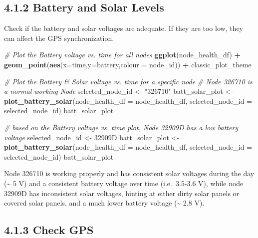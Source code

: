 \documentclass[
]{book}
\newenvironment{Shaded}{\begin{snugshade}}{\end{snugshade}}
\newcommand{\AttributeTok}[1]{\textcolor[rgb]{0.13,0.29,0.53}{#1}}
\newcommand{\CommentTok}[1]{\textcolor[rgb]{0.56,0.35,0.01}{\textit{#1}}}
\newcommand{\FunctionTok}[1]{\textcolor[rgb]{0.13,0.29,0.53}{\textbf{#1}}}
\newcommand{\NormalTok}[1]{#1}
\newcommand{\OtherTok}[1]{\textcolor[rgb]{0.56,0.35,0.01}{#1}}
\newcommand{\SpecialCharTok}[1]{\textcolor[rgb]{0.81,0.36,0.00}{\textbf{#1}}}
\newcommand{\StringTok}[1]{\textcolor[rgb]{0.31,0.60,0.02}{#1}}
\begin{document}
\subsection{4.1.2 Battery and Solar Levels}\label{battery-and-solar-levels}

Check if the battery and solar voltages are adequate. If they are too low, they can affect the GPS synchronization.

\begin{Shaded}
\begin{Highlighting}[]
\CommentTok{\# Plot the Battery voltage vs. time for all nodes}
\FunctionTok{ggplot}\NormalTok{(node\_health\_df) }\SpecialCharTok{+}
  \FunctionTok{geom\_point}\NormalTok{(}\FunctionTok{aes}\NormalTok{(}\AttributeTok{x=}\NormalTok{time,}\AttributeTok{y=}\NormalTok{battery,}\AttributeTok{colour =}\NormalTok{ node\_id)) }\SpecialCharTok{+}
\NormalTok{  classic\_plot\_theme}

\CommentTok{\# Plot the Battery \& Solar voltage vs. time for a specific node}
\CommentTok{\# Node 326710 is a normal working Node}
\NormalTok{selected\_node\_id }\OtherTok{\textless{}{-}} \StringTok{"326710"}
\NormalTok{batt\_solar\_plot }\OtherTok{\textless{}{-}} \FunctionTok{plot\_battery\_solar}\NormalTok{(}\AttributeTok{node\_health\_df =}\NormalTok{ node\_health\_df, }\AttributeTok{selected\_node\_id =}\NormalTok{ selected\_node\_id)}
\NormalTok{batt\_solar\_plot }

\CommentTok{\# based on the Battery voltage vs. time plot, Node 32909D has a low battery voltage}
\NormalTok{selected\_node\_id }\OtherTok{\textless{}{-}} \StringTok{\textquotesingle{}32909D\textquotesingle{}}
\NormalTok{batt\_solar\_plot }\OtherTok{\textless{}{-}} \FunctionTok{plot\_battery\_solar}\NormalTok{(}\AttributeTok{node\_health\_df =}\NormalTok{ node\_health\_df, }\AttributeTok{selected\_node\_id =}\NormalTok{ selected\_node\_id)}
\NormalTok{batt\_solar\_plot }
\end{Highlighting}
\end{Shaded}

Node 326710 is working properly and has consistent solar voltages during the day (\textasciitilde{} 5 V) and a consistent battery voltage over time (i.e.~3.5-3.6 V), while node 32909D has inconsistent solar voltages, hinting at either dirty solar panels or covered solar panels, and a much lower battery voltage (\textasciitilde{} 2.8 V).

\subsection{4.1.3 Check GPS}\label{check-gps}
\end{document}
